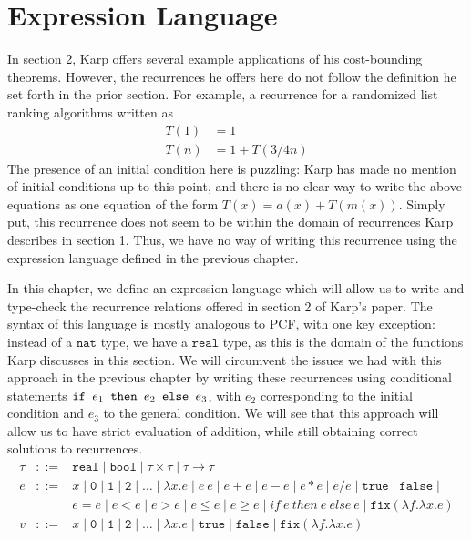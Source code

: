 \chapter{Expression Language}
In section 2, Karp offers several example applications of his cost-bounding theorems. However, the recurrences
he offers here do not follow the definition he set forth in the prior section. For example, a recurrence for a randomized list 
ranking algorithms written as
\begin{align*}
T(1) &= 1 \\
T(n) &= 1 + T(3/4n)
\end{align*}
The presence of an initial condition here is puzzling: Karp has made no mention of initial conditions up to this point, and 
there is no clear way to write the above equations as one equation of the form $T(x) = a(x) + T(m(x))$. Simply put, 
this recurrence does not seem to be within the domain of recurrences Karp describes in section 1. Thus, we have no way
of writing this recurrence using the expression language defined in the previous chapter. 

In this chapter, we define an expression language which will allow us to write and type-check the recurrence relations offered 
in section 2 of Karp's paper. The syntax of this language is mostly analogous to PCF, with one key exception: instead of a 
$\texttt{nat}$ type, we have a $\texttt{real}$ type, as this is the domain of the functions Karp discusses in this section. 
We will circumvent the issues we had with this approach in the previous chapter by writing these recurrences
using conditional statements $\texttt{if } e_1 \texttt{ then } e_2 \texttt{ else } e_3$, with $e_2$ corresponding to the initial condition and $e_3$
to the general condition. We will see that this approach will allow us to have strict evaluation of addition, while
still obtaining correct solutions to recurrences.\\ 
\[
\begin{array}{rcl}
\tau &::=& \texttt{real} \mid \texttt{bool} \mid \tau \times \tau \mid \tau \rightarrow \tau \\
e &::=& x  \mid \texttt{0} \mid \texttt{1} \mid \texttt{2} \mid \dotsc \mid \lambda x.e \mid e \ e \mid e + e \mid e - e \mid  e  *  e 
\mid e / e \mid \texttt{true} \mid \texttt{false} \mid \\
  && e  =  e \mid e < e \mid e > e \mid e \leq e \mid e \geq e \mid 
     if \ e \ then \ e \ else \ e \mid \texttt{fix} (\lambda f.\lambda x.e) \\
v &::=& x  \mid \texttt{0} \mid \texttt{1} \mid \texttt{2} \mid \dotsc \mid \lambda x.e \mid \texttt{true} \mid \texttt{false} \mid 
\texttt{fix} (\lambda f.\lambda x.e)
\end{array}
\]


